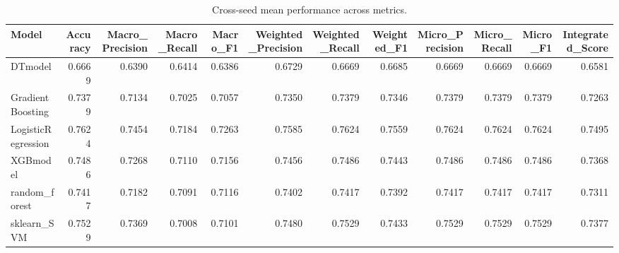 \begin{table}[t]
\centering
\begin{tabular}{lrrrrrrrrrrr}
\toprule
Model & Accuracy & Macro_Precision & Macro_Recall & Macro_F1 & Weighted_Precision & Weighted_Recall & Weighted_F1 & Micro_Precision & Micro_Recall & Micro_F1 & Integrated_Score \\
\midrule
DTmodel & 0.6669 & 0.6390 & 0.6414 & 0.6386 & 0.6729 & 0.6669 & 0.6685 & 0.6669 & 0.6669 & 0.6669 & 0.6581 \\
GradientBoosting & 0.7379 & 0.7134 & 0.7025 & 0.7057 & 0.7350 & 0.7379 & 0.7346 & 0.7379 & 0.7379 & 0.7379 & 0.7263 \\
LogisticRegression & 0.7624 & 0.7454 & 0.7184 & 0.7263 & 0.7585 & 0.7624 & 0.7559 & 0.7624 & 0.7624 & 0.7624 & 0.7495 \\
XGBmodel & 0.7486 & 0.7268 & 0.7110 & 0.7156 & 0.7456 & 0.7486 & 0.7443 & 0.7486 & 0.7486 & 0.7486 & 0.7368 \\
random_forest & 0.7417 & 0.7182 & 0.7091 & 0.7116 & 0.7402 & 0.7417 & 0.7392 & 0.7417 & 0.7417 & 0.7417 & 0.7311 \\
sklearn_SVM & 0.7529 & 0.7369 & 0.7008 & 0.7101 & 0.7480 & 0.7529 & 0.7433 & 0.7529 & 0.7529 & 0.7529 & 0.7377 \\
\bottomrule
\end{tabular}
\caption{Cross-seed mean performance across metrics.}
\label{tab:cross_seed_mean}
\end{table}